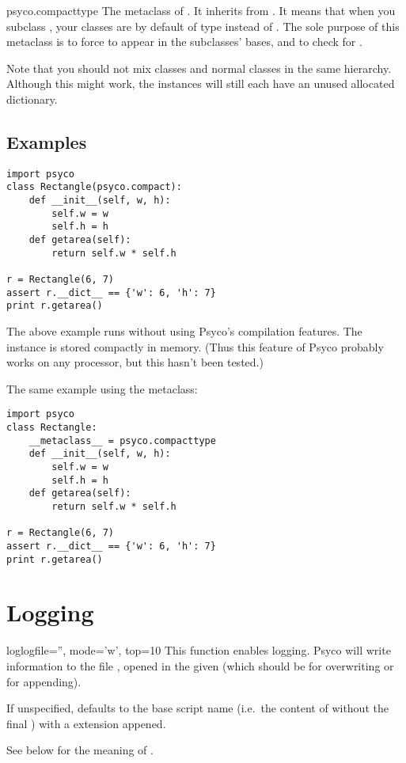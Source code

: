 \documentclass{manual}
\begin{document}
\begin{classdesc*}{psyco.compacttype}
The metaclass of .  It inherits from .  It means that when you subclass , your classes are by default of type  instead of .  The sole purpose of this metaclass is to force  to appear in the subclasses' bases, and to check for .

Note that you should not mix  classes and normal classes in the same hierarchy.  Although this might work, the instances will still each have an unused allocated dictionary.
\end{classdesc*}

\subsection{Examples}

\begin{verbatim}
import psyco
class Rectangle(psyco.compact):
    def __init__(self, w, h):
        self.w = w
        self.h = h
    def getarea(self):
        return self.w * self.h

r = Rectangle(6, 7)
assert r.__dict__ == {'w': 6, 'h': 7}
print r.getarea()
\end{verbatim}

The above example runs without using Psyco's compilation features.  The  instance is stored compactly in memory.  (Thus this feature of Psyco probably works on any processor, but this hasn't been tested.)

The same example using the metaclass:

\begin{verbatim}
import psyco
class Rectangle:
    __metaclass__ = psyco.compacttype
    def __init__(self, w, h):
        self.w = w
        self.h = h
    def getarea(self):
        return self.w * self.h

r = Rectangle(6, 7)
assert r.__dict__ == {'w': 6, 'h': 7}
print r.getarea()
\end{verbatim}


\section{Logging}

\begin{funcdesc}{log}{logfile='', mode='w', top=10}
This function enables logging. Psyco will write information to the file , opened in the given  (which should be  for overwriting or  for appending).

If unspecified,  defaults to the base script name (i.e.\ the content of  without the final ) with a  extension appened.

See below for the meaning of .
\end{funcdesc}
\end{document}
